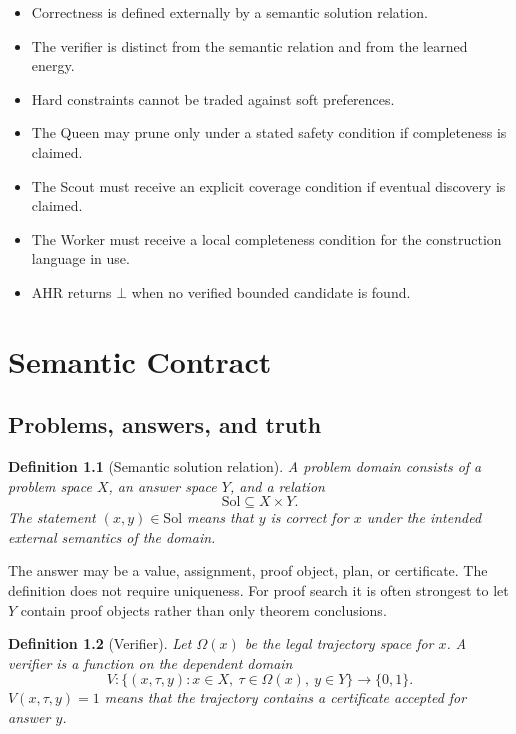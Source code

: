\documentclass[11pt,oneside]{book}
\newtheorem{definition}{Definition}[chapter]
\theoremstyle{remark}
\newcommand{\Sol}{\mathrm{Sol}}
\newcommand{\Om}{\Omega}
\begin{document}
\begin{itemize}
  \item Correctness is defined externally by a semantic solution relation.
  \item The verifier is distinct from the semantic relation and from the learned energy.
  \item Hard constraints cannot be traded against soft preferences.
  \item The Queen may prune only under a stated safety condition if completeness is claimed.
  \item The Scout must receive an explicit coverage condition if eventual discovery is claimed.
  \item The Worker must receive a local completeness condition for the construction language in use.
  \item AHR returns $\bot$ when no verified bounded candidate is found.
\end{itemize}

\chapter{Semantic Contract}

\section{Problems, answers, and truth}

\begin{definition}[Semantic solution relation]
A problem domain consists of a problem space $X$, an answer space $Y$, and a relation
\[
\Sol\subseteq X\times Y.
\]
The statement $(x,y)\in\Sol$ means that $y$ is correct for $x$ under the intended external semantics of the domain.
\end{definition}

The answer may be a value, assignment, proof object, plan, or certificate. The definition does not require uniqueness. For proof search it is often strongest to let $Y$ contain proof objects rather than only theorem conclusions.

\begin{definition}[Verifier]
Let $\Om(x)$ be the legal trajectory space for $x$. A verifier is a function on the dependent domain
\[
V:\{(x,\tau,y):x\in X,\ \tau\in\Om(x),\ y\in Y\}\longrightarrow\{0,1\}.
\]
$V(x,\tau,y)=1$ means that the trajectory contains a certificate accepted for answer $y$.
\end{definition}
\end{document}
